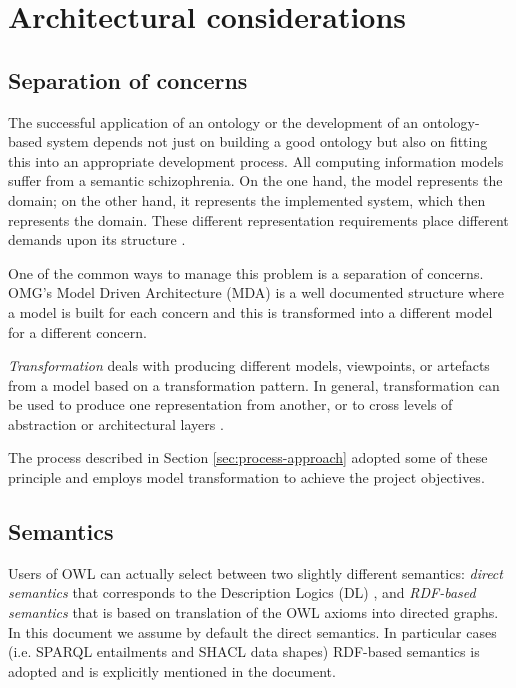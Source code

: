 \section{Architectural considerations}
\label{sec:architecture}

	\subsection{Separation of concerns}
	\label{sec:separation-conceprns}
	
	The successful application of an ontology or the development of an ontology-based system depends not just on building a good ontology but also on fitting this into an appropriate development  process.  All computing information models suffer from a semantic schizophrenia. On the one hand, the model represents the domain; on the other hand, it represents the implemented system, which then represents the domain. These different representation requirements place different demands upon its structure \cite{partridge2013}.
	
	One of the common ways to manage this problem is a separation of concerns. OMG's Model Driven Architecture (MDA) \cite{mda-paper} is a well documented structure where a model is built for each concern and this is transformed into a different model for a different concern. 
	
	\textit{Transformation} deals with producing different models, viewpoints, or artefacts from a model based on a transformation pattern. In general, transformation can be used to produce one representation from another, or to cross levels of abstraction or architectural layers \cite{mda-guide2}. 
	
	The process described in Section \ref{sec:process-approach} adopted some of these principle and employs model transformation to achieve the project objectives.

	\subsection{Semantics}
	\label{sec:semantics}
	
	Users of OWL \citep{owl2} can actually select between two slightly different semantics: \textit{direct semantics} that corresponds to the Description Logics (DL) \cite{dl-baader2004description}, and \textit{RDF-based semantics} that is based on translation of the OWL axioms into directed graphs. In this document we assume by default the direct semantics. In particular cases (i.e. SPARQL entailments and SHACL data shapes) RDF-based semantics is adopted and is explicitly mentioned in the document. 
	
